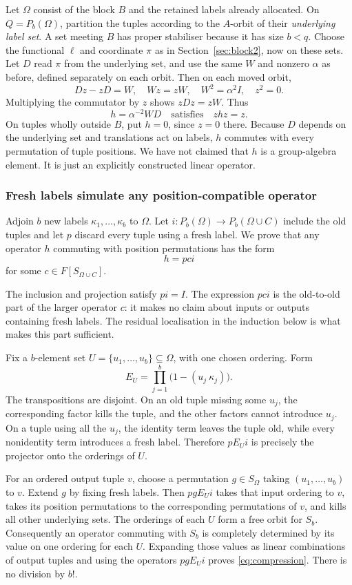 Let $\Omega$ consist of the block $B$ and the retained labels already allocated. On $Q=P_b(\Omega)$, partition the tuples according to the $A$-orbit of their \emph{underlying label set}. A set meeting $B$ has proper stabiliser because it has size $b<q$. Choose the functional $\ell$ and coordinate $\pi$ as in Section~\ref{sec:block2}, now on these sets. Let $D$ read $\pi$ from the underlying set, and use the same $W$ and nonzero $\alpha$ as before, defined separately on each orbit. Then on each moved orbit,
\[Dz-zD=W,\quad Wz=zW,\quad W^2=\alpha^2I,\quad z^2=0.\]
Multiplying the commutator by $z$ shows $zDz=zW$. Thus
\[h=\alpha^{-2}WD\quad\text{satisfies}\quad zhz=z.\]
On tuples wholly outside $B$, put $h=0$, since $z=0$ there. Because $D$ depends on the underlying set and translations act on labels, $h$ commutes with every permutation of tuple positions. We have not claimed that $h$ is a group-algebra element. It is just an explicitly constructed linear operator.

\subsubsection{Fresh labels simulate any position-compatible operator}
Adjoin $b$ new labels $\kappa_1,\ldots,\kappa_b$ to $\Omega$. Let $i:P_b(\Omega)\to P_b(\Omega\cup C)$ include the old tuples and let $p$ discard every tuple using a fresh label. We prove that any operator $h$ commuting with position permutations has the form
\begin{equation}\label{eq:compression}h=pci\end{equation}
for some $c\in F[S_{\Omega\cup C}]$.

The inclusion and projection satisfy $pi=I$. The expression $pci$
is the old-to-old part of the larger operator $c$: it makes no claim
about inputs or outputs containing fresh labels. The residual
localisation in the induction below is what makes this part sufficient.

Fix a $b$-element set $U=\{u_1,\ldots,u_b\}\subseteq\Omega$, with one chosen ordering. Form
\[E_U=\prod_{j=1}^b\bigl(1-(u_j\ \kappa_j)\bigr).\]
The transpositions are disjoint. On an old tuple missing some $u_j$, the corresponding factor kills the tuple, and the other factors cannot introduce $u_j$. On a tuple using all the $u_j$, the identity term leaves the tuple old, while every nonidentity term introduces a fresh label. Therefore $pE_Ui$ is precisely the projector onto the orderings of $U$.

For an ordered output tuple $v$, choose a permutation $g\in S_\Omega$ taking $(u_1,\ldots,u_b)$ to $v$. Extend $g$ by fixing fresh labels. Then $pgE_Ui$ takes that input ordering to $v$, takes its position permutations to the corresponding permutations of $v$, and kills all other underlying sets. The orderings of each $U$ form a free orbit for $S_b$. Consequently an operator commuting with $S_b$ is completely determined by its value on one ordering for each $U$. Expanding those values as linear combinations of output tuples and using the operators $pgE_Ui$ proves \eqref{eq:compression}. There is no division by $b!$.

